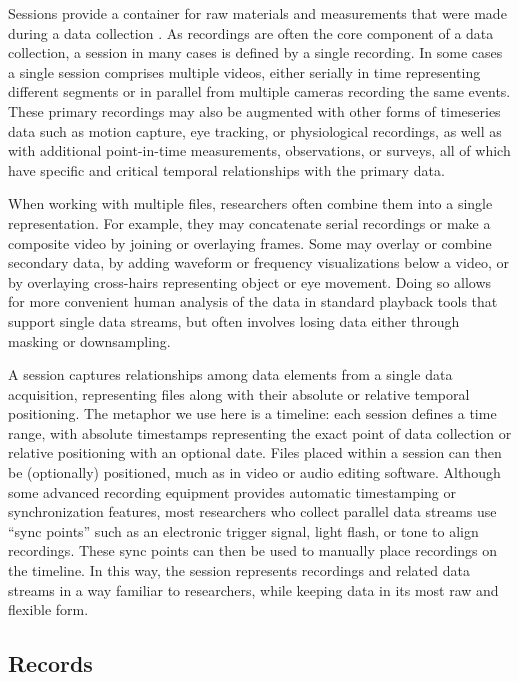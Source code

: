 \documentclass{sig-alternate}
\begin{document}
Sessions provide a container for raw materials and measurements that were made during a data collection \cite{Bakeman_2012}.
As recordings are often the core component of a data collection, a session in many cases is defined by a single recording.
In some cases a single session comprises multiple videos, either serially in time representing different segments or in parallel from multiple cameras recording the same events.
These primary recordings may also be augmented with other forms of timeseries data such as motion capture, eye tracking, or physiological recordings, as well as with additional point-in-time measurements, observations, or surveys, all of which have specific and critical temporal relationships with the primary data.

When working with multiple files, researchers often combine them into a single representation.
For example, they may concatenate serial recordings or make a composite video by joining or overlaying frames.
Some may overlay or combine secondary data, by adding waveform or frequency visualizations below a video, or by overlaying cross-hairs representing object or eye movement.
Doing so allows for more convenient human analysis of the data in standard playback tools that support single data streams, but often involves losing data either through masking or downsampling.

A session captures relationships among data elements from a single data acquisition, representing files along with their absolute or relative temporal positioning.
The metaphor we use here is a timeline: each session defines a time range, with absolute timestamps representing the exact point of data collection or relative positioning with an optional date.
Files placed within a session can then be (optionally) positioned, much as in video or audio editing software.
Although some advanced recording equipment provides automatic timestamping or synchronization features, most researchers who collect parallel data streams use ``sync points'' such as an electronic trigger signal, light flash, or tone to align recordings.
These sync points can then be used to manually place recordings on the timeline.
In this way, the session represents recordings and related data streams in a way familiar to researchers, while keeping data in its most raw and flexible form.

\subsection{Records}
\end{document}

